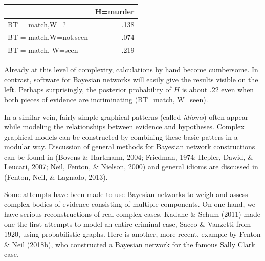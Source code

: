 \documentclass[11pt,dvipsnames,enabledeprecatedfontcommands]{scrartcl}
\begin{document}
\vspace{1mm}

\begin{minipage}[c]{0.4\linewidth}
\begin{tabular}{lr}
\toprule
  & H=murder\\
\midrule
BT = match,W=? & .138\\
BT = match,W=not.seen & .074\\
BT = match, W=seen & .219\\
\bottomrule
\end{tabular}
\end{minipage}\begin{minipage}[c]{0.575\linewidth}
Already at this level of complexity, calculations by hand become cumbersome. In contrast,  software for Bayesian networks  will easily give the results visible on the left. Perhaps surprisingly, the posterior probability of $H$ is about .22 even when both pieces of evidence are incriminating (BT=match, W=seen).
\end{minipage}

\vspace{2mm}

In a similar vein, fairly simple graphical patterns (called
\emph{idioms}) often appear while modeling the relationships between
evidence and hypotheses. Complex graphical models can be constructed by
combining these basic patters in a modular way. Discussion of general
methods for Bayesian network constructions can be found in (Bovens \&
Hartmann, 2004; Friedman, 1974; Hepler, Dawid, \& Leucari, 2007; Neil,
Fenton, \& Nielson, 2000) and general idioms are discussed in (Fenton,
Neil, \& Lagnado, 2013).

Some attempts have been made to use Bayesian networks to weigh and
assess complex bodies of evidence consisting of multiple components. On
one hand, we have serious reconstructions of real complex cases. Kadane
\& Schum (2011) made one the first attempts to model an entire criminal
case, Sacco \& Vanzetti from 1920, using probabilistic graphs. Here is
another, more recent, example by Fenton \& Neil (2018b), who constructed
a Bayesian network for the famous Sally Clark case.

\noindent
\end{document}
